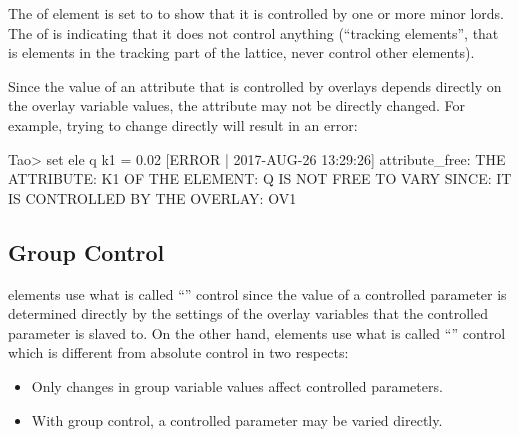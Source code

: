 \documentclass{hitec}     %
\begin{document}
The  of element  is set to  to show that it is controlled by
one or more minor lords. The  of  is  indicating that it does
not control anything (``tracking elements'', that is elements in the tracking part of the lattice,
never control other elements).

Since the value of an attribute that is controlled by overlays depends directly on the overlay
variable values, the attribute may not be directly changed. For example, trying to change
 directly will result in an error:
\begin{code}
Tao> set ele q k1 = 0.02
[ERROR | 2017-AUG-26 13:29:26] attribute_free:
    THE ATTRIBUTE: K1
    OF THE ELEMENT: Q
    IS NOT FREE TO VARY SINCE:
    IT IS CONTROLLED BY THE OVERLAY: OV1
\end{code}

\subsection{Group Control}

 elements use what is called ``'' control since the value of a controlled
parameter is determined directly by the settings of the overlay variables that the controlled
parameter is slaved to.  On the other hand,  elements use what is called ``''
control which is different from absolute control in two respects:
\begin{itemize}
\item
Only changes in group variable values affect controlled parameters.
\item
With group control, a controlled parameter may be varied directly.
\end{itemize}
\end{document}
